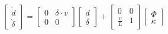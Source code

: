 
    \begin{align} \label{eq:of3}
        \begin{bmatrix}
               \dot{d} \\
               \dot{\delta}
        \end{bmatrix}
        =
        \begin{bmatrix}
               0 & \delta \cdot v \\
               0 & 0
        \end{bmatrix}
        \begin{bmatrix}
               d \\
               \delta
        \end{bmatrix}
		+
        \begin{bmatrix}
           0 & 0 \\
           \frac{v}{L} & 1
         \end{bmatrix}
         \begin{bmatrix}
               \Phi \\
               \kappa
        \end{bmatrix}
     \end{align}

